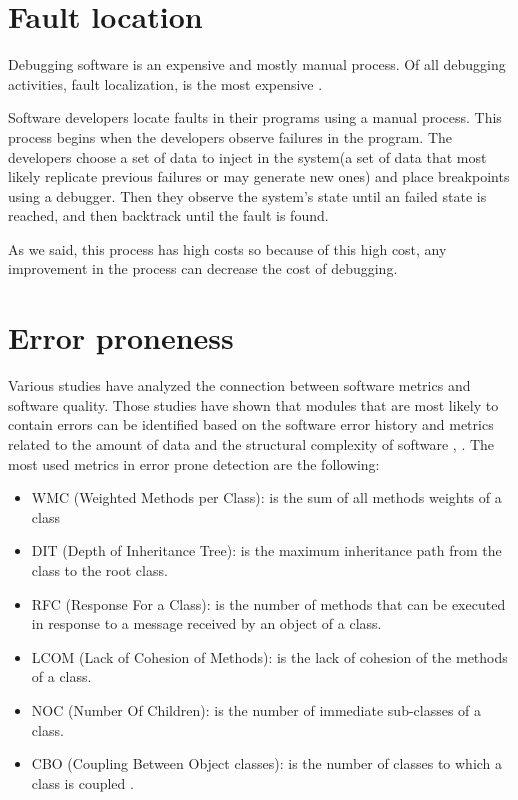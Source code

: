 \documentclass[12pt]{mitthesis}
\begin{document}
\section{Fault location}
Debugging software is an expensive and mostly manual process. Of all debugging activities, fault localization, is the most expensive \cite{articleDebugging}. 

Software developers locate faults in their programs using a manual process. This process begins when the developers observe failures in the program. The developers choose a set of data to inject in the system(a set of data that most likely replicate previous failures or may generate new ones) and place breakpoints using a debugger. Then they observe the system's state until an failed state is reached, and then backtrack until the fault is found. 

As we said, this process has high costs so because of this high cost, any improvement in the process can decrease the cost of debugging.\cite{fault-localization} \cite{program-failures}


\section{Error proneness}
Various studies have analyzed the connection between software metrics and software quality. \cite{544352}
Those studies have shown that modules that are most likely to contain errors can be identified based on the software error history and metrics related to the amount of data and the structural complexity of software \cite{67595}, \cite{1702015}.
The most used metrics in error prone detection are the following:
\begin{itemize}
	\item WMC (Weighted Methods per Class): is the sum of all methods weights of a class
	\item DIT (Depth of Inheritance Tree): is the maximum inheritance path from the class to the root class.
	\item RFC (Response For a Class): is the number of methods that can be executed in response to a message received by an object of a class.
	\item LCOM (Lack of Cohesion of Methods): is the lack of cohesion of the methods of a class.
	\item NOC (Number Of Children): is the number of immediate sub-classes of a class.
	\item CBO (Coupling Between Object classes): is the number of classes to which a class is coupled \cite{295895}.
\end{itemize}
\end{document}
